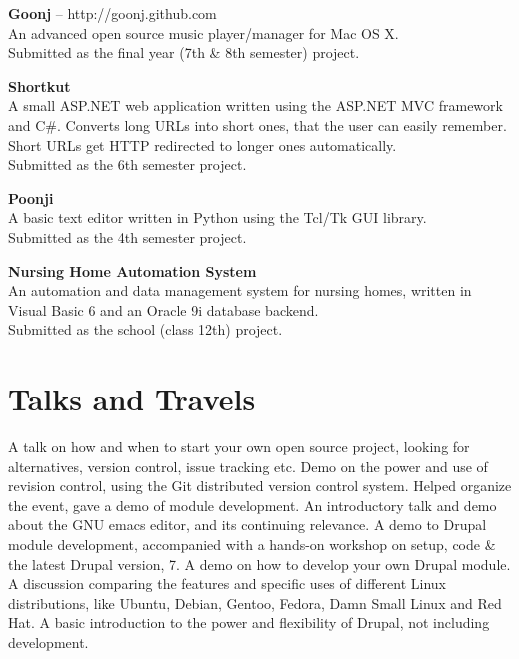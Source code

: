 \documentclass[11pt,a4paper]{moderncv}
\begin{document}
\cvlistitem
{\textbf{Goonj} -- {\small http://goonj.github.com}
\\An advanced open source music player/manager for Mac OS X.
\\Submitted as the final year (7th \& 8th semester) project.\\
}

\cvlistitem
{\textbf{Shortkut}
\\A small ASP.NET web application written using the ASP.NET MVC framework and C\#. Converts long URLs into short ones, that the user can easily remember. Short URLs get HTTP redirected to longer ones automatically.
\\Submitted as the 6th semester project.\\
}

\cvlistitem
{\textbf{Poonji}
\\A basic text editor written in Python using the Tcl/Tk GUI library.
\\Submitted as the 4th semester project.\\
}

\cvlistitem
{\textbf{Nursing Home Automation System}
\\An automation and data management system for nursing homes, written in Visual Basic 6 and an Oracle 9i database backend.
\\Submitted as the school (class 12th) project.\\
}

\pagebreak

\section{Talks and Travels}

{A talk on how and when to start your own open source project, looking for alternatives, version control, issue tracking etc.}
{Demo on the power and use of revision control, using the Git distributed version control system.}
{Helped organize the event, gave a demo of module development.}
{An introductory talk and demo about the GNU emacs editor, and its continuing relevance.}
{A demo to Drupal module development, accompanied with a hands-on workshop on setup, code \& the latest Drupal version, 7.}
{A demo on how to develop your own Drupal module.}
{A discussion comparing the features and specific uses of different Linux distributions, like Ubuntu, Debian, Gentoo, Fedora, Damn Small Linux and Red Hat.}
{A basic introduction to the power and flexibility of Drupal, not including development.\\}
\end{document}
